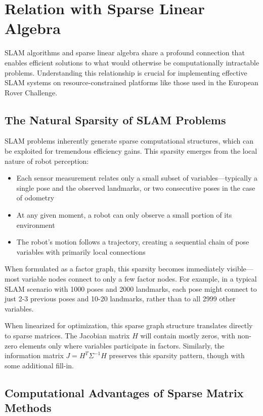 \documentclass[journal]{IEEEtran}
\begin{document}
\section{Relation with Sparse Linear Algebra}

SLAM algorithms and sparse linear algebra share a profound connection that enables efficient solutions to what would otherwise be computationally intractable problems. Understanding this relationship is crucial for implementing effective SLAM systems on resource-constrained platforms like those used in the European Rover Challenge.

\subsection{The Natural Sparsity of SLAM Problems}

SLAM problems inherently generate sparse computational structures, which can be exploited for tremendous efficiency gains. This sparsity emerges from the local nature of robot perception:

\begin{itemize}
    \item Each sensor measurement relates only a small subset of variables—typically a single pose and the observed landmarks, or two consecutive poses in the case of odometry
    \item At any given moment, a robot can only observe a small portion of its environment
    \item The robot's motion follows a trajectory, creating a sequential chain of pose variables with primarily local connections
\end{itemize}

When formulated as a factor graph, this sparsity becomes immediately visible—most variable nodes connect to only a few factor nodes. For example, in a typical SLAM scenario with 1000 poses and 2000 landmarks, each pose might connect to just 2-3 previous poses and 10-20 landmarks, rather than to all 2999 other variables.

When linearized for optimization, this sparse graph structure translates directly to sparse matrices. The Jacobian matrix $H$ will contain mostly zeros, with non-zero elements only where variables participate in factors. Similarly, the information matrix $J = H^T\Sigma^{-1}H$ preserves this sparsity pattern, though with some additional fill-in.

\subsection{Computational Advantages of Sparse Matrix Methods}
\end{document}
